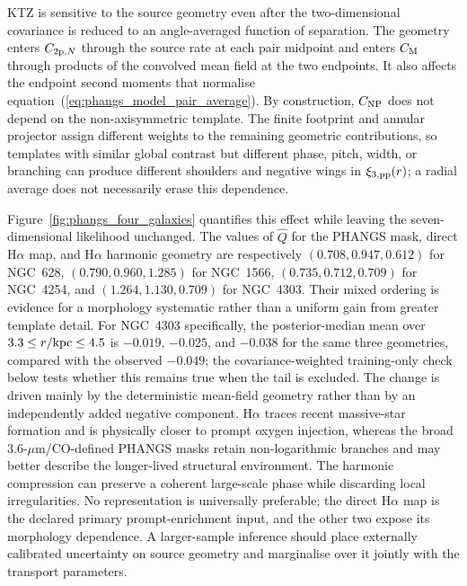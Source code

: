 \documentclass[fleqn,usenatbib]{mnras}
\begin{document}
KTZ is sensitive to the source geometry even after the two-dimensional covariance is reduced to an angle-averaged function of separation.  The geometry enters $C_{{\rm 2p},N}$ through the source rate at each pair midpoint and enters $C_{\rm M}$ through products of the convolved mean field at the two endpoints.  It also affects the endpoint second moments that normalise equation~(\ref{eq:phangs_model_pair_average}).  By construction, $C_{\rm NP}$ does not depend on the non-axisymmetric template.  The finite footprint and annular projector assign different weights to the remaining geometric contributions, so templates with similar global contrast but different phase, pitch, width, or branching can produce different shoulders and negative wings in $\xi_{3,{\rm pp}}(r)$; a radial average does not necessarily erase this dependence.

Figure~\ref{fig:phangs_four_galaxies} quantifies this effect while leaving the seven-dimensional likelihood unchanged.  The values of $\widehat Q$ for the PHANGS mask, direct H$\alpha$ map, and H$\alpha$ harmonic geometry are respectively $(0.708,0.947,0.612)$ for NGC~628, $(0.790,0.960,1.285)$ for NGC~1566, $(0.735,0.712,0.709)$ for NGC~4254, and $(1.264,1.130,0.709)$ for NGC~4303.  Their mixed ordering is evidence for a morphology systematic rather than a uniform gain from greater template detail.  For NGC~4303 specifically, the posterior-median mean over $3.3\leq r/{\rm kpc}\leq4.5$ is $-0.019$, $-0.025$, and $-0.038$ for the same three geometries, compared with the observed $-0.049$; the covariance-weighted training-only check below tests whether this remains true when the tail is excluded.  The change is driven mainly by the deterministic mean-field geometry rather than by an independently added negative component.  H$\alpha$ traces recent massive-star formation and is physically closer to prompt oxygen injection, whereas the broad 3.6-$\mu\mathrm{m}$/CO-defined PHANGS masks retain non-logarithmic branches and may better describe the longer-lived structural environment.  The harmonic compression can preserve a coherent large-scale phase while discarding local irregularities.  No representation is universally preferable; the direct H$\alpha$ map is the declared primary prompt-enrichment input, and the other two expose its morphology dependence.  A larger-sample inference should place externally calibrated uncertainty on source geometry and marginalise over it jointly with the transport parameters.
\end{document}
